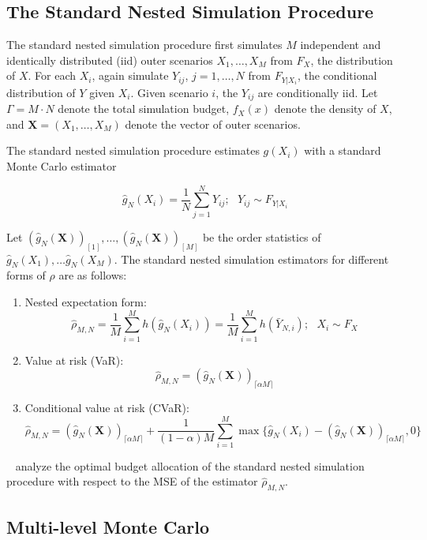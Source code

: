 \subsection{The Standard Nested Simulation Procedure}

The standard nested simulation procedure first simulates $M$ independent and identically distributed (iid) outer scenarios $X_1, \dots, X_M$ from $F_X$, the distribution of $X$.
For each $X_i$, again simulate $Y_{ij}$, $j = 1, \dots, N$ from $F_{Y|X_i}$, the conditional distribution of $Y$ given $X_i$. Given scenario $i$, the $Y_{ij}$ are conditionally iid. Let $\Gamma = M \cdot N$ denote the total simulation budget, $f_X(x)$ denote the density of $X$, and $\mathbf{X} = (X_1, \dots, X_M)$ denote the vector of outer scenarios.

The standard nested simulation procedure estimates $g(X_i)$ with a standard Monte Carlo estimator 

$$\hat{g}_N(X_i) = \frac{1}{N} \sum_{j=1}^N Y_{ij}; ~~~ Y_{ij} \sim F_{Y|X_i} $$

Let $(\hat{g}_N(\mathbf{X}))_{[1]}, \dots, (\hat{g}_N(\mathbf{X}))_{[M]}$ be the order statistics of $\hat{g}_N(X_1), \dots \hat{g}_N(X_M)$. 
The standard nested simulation estimators for different forms of $\rho$ are as follows:

\begin{enumerate}
    \item   Nested expectation form:
            $$\hat{\rho}_{M, N} = \frac{1}{M} \sum_{i=1}^M h(\hat{g}_N(X_i)) = \frac{1}{M} \sum_{i=1}^M h(\bar{Y}_{N, i}); ~~~ X_i \sim F_X$$
    \item   Value at risk (VaR):
            $$\hat{\rho}_{M, N} = (\hat{g}_N(\mathbf{X}))_{\lceil \alpha M \rceil}$$
    \item   Conditional value at risk (CVaR):
            $$\hat{\rho}_{M, N} = (\hat{g}_N(\mathbf{X}))_{\lceil \alpha M \rceil} + \frac{1}{(1-\alpha) M} \sum_{i=1}^M \max \{\hat{g}_N(X_i) - (\hat{g}_N(\mathbf{X}))_{\lceil \alpha M \rceil}, 0 \}$$
\end{enumerate}

~\cite{gordy2010nested} analyze the optimal budget allocation of the standard nested simulation procedure with respect to the MSE of the estimator $\hat{\rho}_{M, N}$.


\subsection{Multi-level Monte Carlo}

